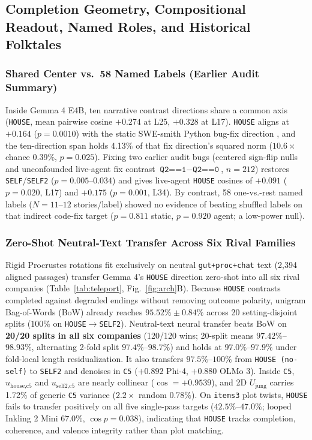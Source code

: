 \documentclass[conference]{IEEEtran}
\begin{document}
\subsection{Completion Geometry, Compositional Readout, Named Roles, and Historical Folktales}
\label{sec:jung}
\subsubsection{Shared Center vs.\ 58 Named Labels (Earlier Audit Summary)}
Inside Gemma 4 E4B, ten narrative contrast directions share a common axis (\texttt{HOUSE}, mean pairwise cosine $+0.274$ at L25, $+0.328$ at L17). \texttt{HOUSE} aligns at $+0.164$ ($p=0.0010$) with the static SWE-smith Python bug-fix direction \cite{yang2025swesmith}, and the ten-direction span holds 4.13\% of that fix direction's squared norm ($10.6\times$ chance 0.39\%, $p=0.025$). Fixing two earlier audit bugs (centered sign-flip nulls and unconfounded live-agent fix contrast $\texttt{Q2==1}-\texttt{Q2==0}$, $n=212$) restores \texttt{SELF}/\texttt{SELF2} ($p=0.005$--$0.034$) and gives live-agent \texttt{HOUSE} cosines of $+0.091$ ($p=0.020$, L17) and $+0.175$ ($p=0.001$, L34). By contrast, 58 one-vs.-rest named labels ($N=11$--$12$ stories/label) showed no evidence of beating shuffled labels on that indirect code-fix target ($p=0.811$ static, $p=0.920$ agent; a low-power null).

\subsubsection{Zero-Shot Neutral-Text Transfer Across Six Rival Families}
Rigid Procrustes rotations fit exclusively on neutral \texttt{gut+proc+chat} text (2,394 aligned passages) transfer Gemma 4's \texttt{HOUSE} direction zero-shot into all six rival companies (Table~\ref{tab:teleport}, Fig.~\ref{fig:arch}B). Because \texttt{HOUSE} contrasts completed against degraded endings without removing outcome polarity, unigram Bag-of-Words (BoW) already reaches $95.52\%\pm0.84\%$ across 20 setting-disjoint splits ($100\%$ on \texttt{HOUSE}$\to$\texttt{SELF2}). Neutral-text neural transfer beats BoW on \textbf{20/20 splits in all six companies} (120/120 wins; 20-split means $97.42\%$--$98.93\%$, alternating 2-fold split $97.4\%$--$98.7\%$) and holds at $97.0\%$--$97.9\%$ under fold-local length residualization. It also transfers $97.5\%$--$100\%$ from \texttt{HOUSE (no-self)} to \texttt{SELF2} and denoises in \texttt{C5} ($+0.892$ Phi-4, $+0.880$ OLMo 3). Inside \texttt{C5}, $u_{\text{house,c5}}$ and $u_{\text{self2,c5}}$ are nearly collinear ($\cos=+0.9539$), and 2D $U_{\text{jung}}$ carries 1.72\% of generic \texttt{C5} variance ($2.2\times$ random 0.78\%). On \texttt{items3} plot twists, \texttt{HOUSE} fails to transfer positively on all five single-pass targets ($42.5\%$--$47.0\%$; looped Inkling 2 Mini $67.0\%$, $\cos p=0.038$), indicating that \texttt{HOUSE} tracks completion, coherence, and valence integrity rather than plot matching.
\end{document}
